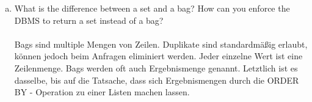 \documentclass[11pt,a4paper,DIV=9]{scrartcl}
\begin{document}
\begin{enumerate}[a.]
\item What is the difference between a set and a bag? How can you enforce the DBMS to return a set instead of a bag? \\\\
Bags sind multiple Mengen von Zeilen. Duplikate sind standardm\"a{\ss}ig erlaubt, k\"onnen jedoch beim Anfragen eliminiert werden. Jeder einzelne Wert ist eine Zeilenmenge. Bags werden oft auch Ergebnismenge genannt. Letztlich ist es dasselbe, bis auf die Tatsache, dass sich Ergebnismengen durch die ORDER BY - Operation zu einer Listen machen lassen.

 \end{enumerate}
\end{document}
